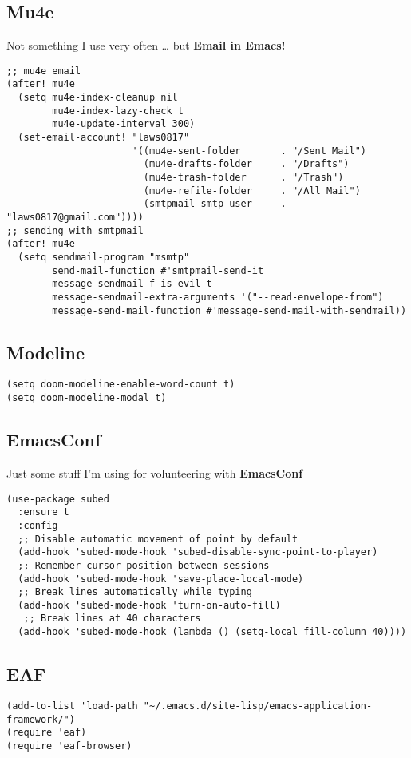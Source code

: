 \documentclass[11pt]{article}
\begin{document}
\subsection{Mu4e}
\label{sec:org4f4f445}
Not something I use very often \ldots{} but \textbf{Email in Emacs!}
\begin{verbatim}
;; mu4e email
(after! mu4e
  (setq mu4e-index-cleanup nil
        mu4e-index-lazy-check t
        mu4e-update-interval 300)
  (set-email-account! "laws0817"
                      '((mu4e-sent-folder       . "/Sent Mail")
                        (mu4e-drafts-folder     . "/Drafts")
                        (mu4e-trash-folder      . "/Trash")
                        (mu4e-refile-folder     . "/All Mail")
                        (smtpmail-smtp-user     . "laws0817@gmail.com"))))
;; sending with smtpmail
(after! mu4e
  (setq sendmail-program "msmtp"
        send-mail-function #'smtpmail-send-it
        message-sendmail-f-is-evil t
        message-sendmail-extra-arguments '("--read-envelope-from")
        message-send-mail-function #'message-send-mail-with-sendmail))
\end{verbatim}
\subsection{Modeline}
\label{sec:org16bbf91}
\begin{verbatim}
(setq doom-modeline-enable-word-count t)
(setq doom-modeline-modal t)
\end{verbatim}
\subsection{EmacsConf}
\label{sec:org19eea00}
Just some stuff I'm using for volunteering with \textbf{EmacsConf}
\begin{verbatim}
(use-package subed
  :ensure t
  :config
  ;; Disable automatic movement of point by default
  (add-hook 'subed-mode-hook 'subed-disable-sync-point-to-player)
  ;; Remember cursor position between sessions
  (add-hook 'subed-mode-hook 'save-place-local-mode)
  ;; Break lines automatically while typing
  (add-hook 'subed-mode-hook 'turn-on-auto-fill)
   ;; Break lines at 40 characters
  (add-hook 'subed-mode-hook (lambda () (setq-local fill-column 40))))
\end{verbatim}
\subsection{EAF}
\label{sec:org130c60a}
\begin{verbatim}
(add-to-list 'load-path "~/.emacs.d/site-lisp/emacs-application-framework/")
(require 'eaf)
(require 'eaf-browser)
\end{verbatim}
\end{document}
